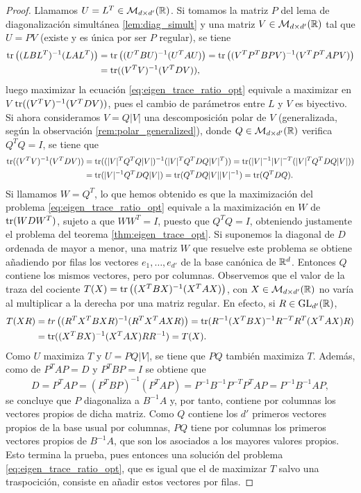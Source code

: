 \begin{proof}
    Llamamos $U = L^T \in \mathcal{M}_{d\times d'}(\mathbb{R})$. Si tomamos la matriz $P$ del lema de diagonalización simultánea \ref{lem:diag_simult} y una matriz $V \in \mathcal{M}_{d\times d'}(\mathbb{R})$ tal que $U = PV$ (existe y es única por ser $P$ regular), se tiene 
    \begin{align*}
        \operatorname{tr}\left((LBL^T)^{-1}(LAL^T)\right) &= \operatorname{tr}\left((U^TBU)^{-1}(U^TAU)\right) = \operatorname{tr}\left((V^TP^TBPV)^{-1}(V^TP^TAPV)\right) \\
        &=\operatorname{tr}((V^TV)^{-1}(V^TDV)),
    \end{align*}
    luego maximizar la ecuación \ref{eq:eigen_trace_ratio_opt} equivale a maximizar en $V$ $\operatorname{tr}((V^TV)^{-1}(V^TDV))$, pues el cambio de parámetros entre $L$ y $V$ es biyectivo. Si ahora consideramos $V = Q|V|$ una descomposición polar de $V$ (generalizada, según la observación \ref{rem:polar_generalized}), donde $Q \in \mathcal{M}_{d\times d'}(\mathbb{R})$ verifica $Q^TQ=I$, se tiene que
    \begin{align*}
        \operatorname{tr}((V^TV)^{-1}(V^TDV)) &= \operatorname{tr}((|V|^TQ^TQ|V|)^{-1}(|V|^TQ^TDQ|V|^T)) = \operatorname{tr}(|V|^{-1}|V|^{-T}(|V|^TQ^TDQ|V|))\\
                                &= \operatorname{tr}(|V|^{-1}Q^TDQ|V|) = \operatorname{tr}(Q^TDQ|V||V|^{-1}) = \operatorname{tr}(Q^TDQ).
    \end{align*}
    Si llamamos $W = Q^T$, lo que hemos obtenido es que la maximización del problema \ref{eq:eigen_trace_ratio_opt} equivale a la maximización en $W$ de $\operatorname{tr}(WDW^T)$, sujeto a que $WW^T = I$, puesto que $Q^TQ = I$, obteniendo justamente el problema del teorema \ref{thm:eigen_trace_opt}. Si suponemos la diagonal de $D$ ordenada de mayor a menor, una matriz $W$ que resuelve este problema se obtiene añadiendo por filas los vectores $e_1,\dots,e_{d'}$ de la base canónica de $\mathbb{R}^d$. Entonces $Q$ contiene los mismos vectores, pero por columnas. Observemos que el valor de la traza del cociente $T(X) = \operatorname{tr}\left((X^TBX)^{-1}(X^TAX)\right)$, con $X \in \mathcal{M}_{d \times d'}(\mathbb{R})$ no varía al multiplicar a la derecha por una matriz regular. En efecto, si $R \in \operatorname{GL}_{d'}(\mathbb{R})$,
    \begin{align*}
        T(XR) &= tr\left((R^TX^TBXR)^{-1}(R^TX^TAXR)\right) = \operatorname{tr}(R^{-1}(X^TBX)^{-1}R^{-T}R^T(X^TAX)R) \\
              &= \operatorname{tr}((X^TBX)^{-1}(X^TAX)RR^{-1}) = T(X).
    \end{align*}
    Como $U$ maximiza $T$ y $U = PQ|V|$, se tiene que $PQ$ también maximiza $T$. Además, como de $P^TAP = D$ y $P^TBP = I$ se obtiene que
    \[ D = P^TAP = (P^TBP)^{-1}(P^TAP) = P^{-1}B^{-1}P^{-T}P^TAP = P^{-1}B^{-1}AP, \]
    se concluye que $P$ diagonaliza a $B^{-1}A$ y, por tanto, contiene por columnas los vectores propios de dicha matriz. Como $Q$ contiene los $d'$ primeros vectores propios de la base usual por columnas, $PQ$ tiene por columnas los primeros vectores propios de $B^{-1}A$, que son los asociados a los mayores valores propios. Esto termina la prueba, pues entonces una solución del problema \ref{eq:eigen_trace_ratio_opt}, que es igual que el de maximizar $T$ salvo una traspocición, consiste en añadir estos vectores por filas.
\end{proof}


